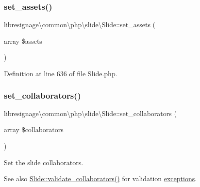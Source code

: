 \mbox{\label{classlibresignage_1_1common_1_1php_1_1slide_1_1Slide_a02f20b916577d56fdeb51c1f5378cda0}} 
\subsubsection{\texorpdfstring{set\+\_\+assets()}{set\_assets()}}
{\footnotesize\ttfamily libresignage\textbackslash{}common\textbackslash{}php\textbackslash{}slide\textbackslash{}\+Slide\+::set\+\_\+assets (\begin{DoxyParamCaption}\item[{array}]{\$assets }\end{DoxyParamCaption})}



Definition at line 636 of file Slide.\+php.

\mbox{\label{classlibresignage_1_1common_1_1php_1_1slide_1_1Slide_a183057a153ef40efb966511410403812}} 
\subsubsection{\texorpdfstring{set\+\_\+collaborators()}{set\_collaborators()}}
{\footnotesize\ttfamily libresignage\textbackslash{}common\textbackslash{}php\textbackslash{}slide\textbackslash{}\+Slide\+::set\+\_\+collaborators (\begin{DoxyParamCaption}\item[{array}]{\$collaborators }\end{DoxyParamCaption})}

Set the slide collaborators.

\begin{DoxySeeAlso}{See also}
\hyperlink{classlibresignage_1_1common_1_1php_1_1slide_1_1Slide_a24d9d8a3e7fafb5fe6fc904b71ea732d}{Slide\+::validate\+\_\+collaborators()} for validation \hyperlink{namespacelibresignage_1_1common_1_1php_1_1slide_1_1exceptions}{exceptions}.
\end{DoxySeeAlso}

